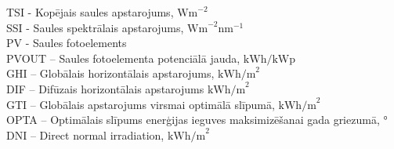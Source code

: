 \noindent TSI - Kopējais saules apstarojums, $\textrm{Wm}^{-2}$\\
SSI - Saules spektrālais apstarojums, $\textrm{Wm}^{-2}\textrm{nm}^{-1}$\\
PV - Saules fotoelements\\ %
PVOUT – Saules fotoelementa potenciālā jauda, $\textrm{kWh/kWp}$\\ %
GHI – Globālais horizontālais apstarojums,  $\textrm{kWh/m}^2$\\ %
DIF – Difūzais horizontālais apstarojums  $\textrm{kWh/m}^2$\\ %
GTI – Globālais apstarojums virsmai optimālā slīpumā, $\textrm{kWh/m}^2$\\ %
OPTA – Optimālais slīpums enerģijas ieguves maksimizēšanai gada griezumā, °\\ %
DNI – Direct normal irradiation, $\textrm{kWh/m}^2$\\ %


